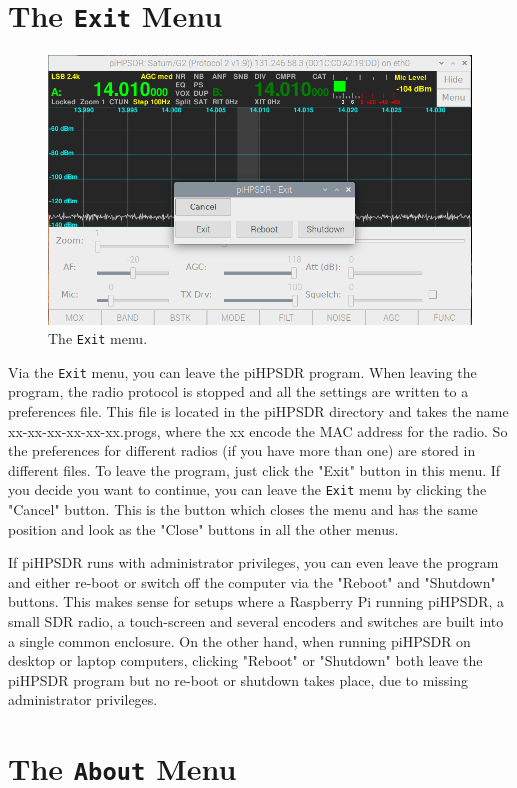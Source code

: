 \documentclass[12pt]{book}
\def\bltt#1{\texttt{\color{blue}#1}}
\begin{document}
\section{The \texttt{Exit} Menu}

\begin{figure}[h]
\center
\includegraphics[width=12cm]{ExitMenu.png}
\caption{The \bltt{Exit} menu.}
\end{figure}

Via the \bltt{Exit} menu, you can leave the piHPSDR program. When leaving the program,
the radio protocol is stopped and all the settings are written to a preferences file. This
file is located in the piHPSDR directory and takes the name xx-xx-xx-xx-xx-xx.progs, where
the xx encode the MAC address for the radio. So the preferences for different radios (if you
have more than one) are stored in different files. To leave the program, just click the
"Exit" button in this menu. If you decide you want to continue, you can leave the \bltt{Exit}
menu by clicking the "Cancel" button. This is the button which closes the menu and has
the same position and look as the "Close" buttons in all the other menus.

If piHPSDR runs with administrator privileges, you can even leave the program and either re-boot
or switch off the computer via the "Reboot" and "Shutdown" buttons. This makes sense for setups 
where a Raspberry Pi running piHPSDR, a small SDR radio, a touch-screen and several encoders
and switches are built into a single common enclosure. On the other hand, when running
piHPSDR on desktop or laptop computers, clicking "Reboot" or "Shutdown" both leave the piHPSDR
program but no re-boot or shutdown takes place, due to missing administrator privileges.

\section{The \texttt{About} Menu}
\end{document}
